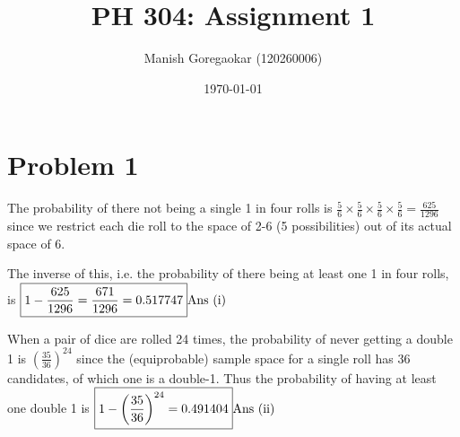 \documentclass[12pt]{article}
\title{PH 304: Assignment 1}
\author{Manish Goregaokar (120260006)}
\date{\today}
\begin{document}
\maketitle
\section*{Problem 1}

The probability of there not being a single 1 in four rolls is $\frac56\times\frac56\times\frac56\times\frac56 = \frac{625}{1296}$ since we restrict each die roll to the space of 2-6 (5 possibilities) out of its actual space of 6.

The inverse of this, i.e. the probability of there being at least one 1 in four rolls, is  $\boxed{1 - \frac{625}{1296} = \frac{671}{1296} = 0.517747}\hfill \text{Ans (i)}$

When a pair of dice are rolled 24 times, the probability of never getting a double 1 is $\left(\frac{35}{36}\right)^{24}$ since the (equiprobable) sample space for a single roll has 36 candidates, of which  one is a double-1. Thus the probability of having at least one double 1 is $\boxed{1-\left(\frac{35}{36}\right)^{24} = 0.491404}\hfill\text{Ans (ii)}$
\end{document}
